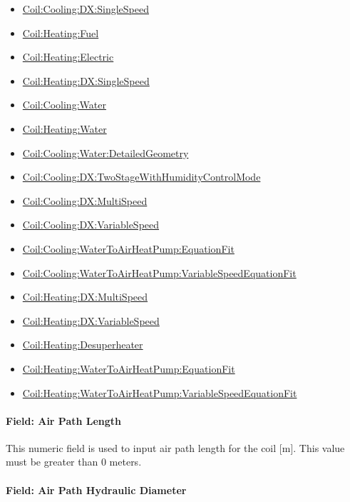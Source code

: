 \begin{itemize}
\item
  \hyperref[coilcoolingdxsinglespeed]{Coil:Cooling:DX:SingleSpeed}
\item
  \hyperref[coilheatinggas-000]{Coil:Heating:Fuel}
\item
  \hyperref[coilheatingelectric]{Coil:Heating:Electric}
\item
  \hyperref[coilheatingdxsinglespeed]{Coil:Heating:DX:SingleSpeed}
\item
  \hyperref[coilcoolingwater]{Coil:Cooling:Water}
\item
  \hyperref[coilheatingwater]{Coil:Heating:Water}
\item
  \hyperref[coilcoolingwaterdetailedgeometry]{Coil:Cooling:Water:DetailedGeometry}
\item
  \hyperref[coilcoolingdxtwostagewithhumiditycontrolmode]{Coil:Cooling:DX:TwoStageWithHumidityControlMode}
\item
  \hyperref[coilcoolingdxmultispeed]{Coil:Cooling:DX:MultiSpeed}
\item
  \hyperref[coilcoolingdxvariablespeed]{Coil:Cooling:DX:VariableSpeed}
\item
  \hyperref[coilheatingdesuperheater]{Coil:Cooling:WaterToAirHeatPump:EquationFit}
\item
  \hyperref[coilheatingdesuperheater]{Coil:Cooling:WaterToAirHeatPump:VariableSpeedEquationFit}
\item
  \hyperref[coilheatingdxmultispeed]{Coil:Heating:DX:MultiSpeed}
\item
  \hyperref[coilheatingdxvariablespeed]{Coil:Heating:DX:VariableSpeed}
\item
  \hyperref[coilheatingdesuperheater]{Coil:Heating:Desuperheater}
\item
  \hyperref[coilheatingdesuperheater]{Coil:Heating:WaterToAirHeatPump:EquationFit}
\item
  \hyperref[coilheatingdesuperheater]{Coil:Heating:WaterToAirHeatPump:VariableSpeedEquationFit}
\end{itemize}

\paragraph{Field: Air Path Length}\label{field-air-path-length}

This numeric field is used to input air path length for the coil {[}m{]}. This value must be greater than 0 meters.

\paragraph{Field: Air Path Hydraulic Diameter}\label{field-air-path-hydraulic-diameter}

